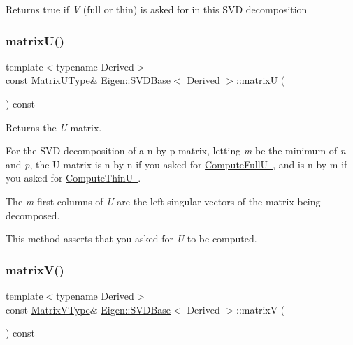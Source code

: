 \begin{DoxyReturn}{Returns}
true if {\itshape V} (full or thin) is asked for in this S\+VD decomposition 
\end{DoxyReturn}
\mbox{\label{class_eigen_1_1_s_v_d_base_afc7fe1546b0f6e1801b86f22f5664cb8}} 
\subsubsection{\texorpdfstring{matrixU()}{matrixU()}}
{\footnotesize\ttfamily template$<$typename Derived$>$ \\
const \mbox{\hyperlink{class_eigen_1_1_matrix}{Matrix\+U\+Type}}\& \mbox{\hyperlink{class_eigen_1_1_s_v_d_base}{Eigen\+::\+S\+V\+D\+Base}}$<$ Derived $>$\+::matrixU (\begin{DoxyParamCaption}{ }\end{DoxyParamCaption}) const\hspace{0.3cm}{\ttfamily [inline]}}

\begin{DoxyReturn}{Returns}
the {\itshape U} matrix.
\end{DoxyReturn}
For the S\+VD decomposition of a n-\/by-\/p matrix, letting {\itshape m} be the minimum of {\itshape n} and {\itshape p}, the U matrix is n-\/by-\/n if you asked for \mbox{\hyperlink{}{Compute\+FullU }}, and is n-\/by-\/m if you asked for \mbox{\hyperlink{}{Compute\+ThinU }}.

The {\itshape m} first columns of {\itshape U} are the left singular vectors of the matrix being decomposed.

This method asserts that you asked for {\itshape U} to be computed. \mbox{\label{class_eigen_1_1_s_v_d_base_a245a453b5e7347f737295c23133238c4}} 
\subsubsection{\texorpdfstring{matrixV()}{matrixV()}}
{\footnotesize\ttfamily template$<$typename Derived$>$ \\
const \mbox{\hyperlink{class_eigen_1_1_matrix}{Matrix\+V\+Type}}\& \mbox{\hyperlink{class_eigen_1_1_s_v_d_base}{Eigen\+::\+S\+V\+D\+Base}}$<$ Derived $>$\+::matrixV (\begin{DoxyParamCaption}{ }\end{DoxyParamCaption}) const\hspace{0.3cm}{\ttfamily [inline]}}

